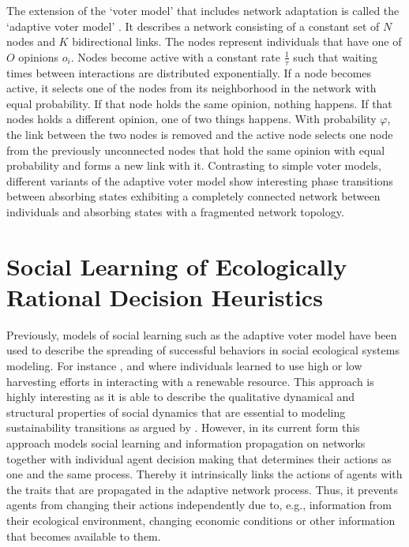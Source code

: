 The extension of the `voter model' that includes network adaptation is called the `adaptive voter model' \citep{Holme2006a, Bohme2011, Rogers2013, Klamser2016, Min2017}. It describes a network consisting of a constant set of $N$ nodes and $K$ bidirectional links. The nodes represent individuals that have one of $O$ opinions $o_i$. Nodes become active with a constant rate $\frac{1}{\tau}$ such that waiting times between interactions are distributed exponentially. If a node becomes active, it selects one of the nodes from its neighborhood in the network with equal probability. If that node holds the same opinion, nothing happens. If that nodes holds a different opinion, one of two things happens. With probability $\varphi$, the link between the two nodes is removed and the active node selects one node from the previously unconnected nodes that hold the same opinion with equal probability and forms a new link with it.
Contrasting to simple voter models, different variants of the adaptive voter model show interesting phase transitions between absorbing states exhibiting a completely connected network between individuals and absorbing states with a fragmented network topology.

\section{Social Learning of Ecologically Rational Decision Heuristics}

Previously, models of social learning such as the adaptive voter model have been used to describe the spreading of successful behaviors in social ecological systems modeling. For instance \cite{Wiedermann2015}, \cite{Barfuss2017} and \cite{Geier2019} where individuals learned to use high or low harvesting efforts in interacting with a renewable resource. This approach is highly interesting as it is able to describe the qualitative dynamical and structural properties of social dynamics that are essential to modeling sustainability transitions as argued by \cite{Lade2017}.
However, in its current form this approach models social learning and information propagation on networks together with individual agent decision making that determines their actions as one and the same process. Thereby it intrinsically links the actions of agents with the traits that are propagated in the adaptive network process. Thus, it prevents agents from changing their actions independently due to, e.g., information from their ecological environment, changing economic conditions or other information that becomes available to them. 


